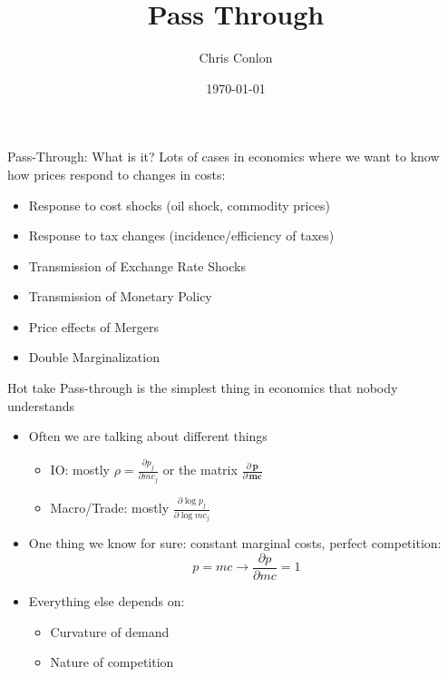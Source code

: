 \documentclass[aspectratio=169,10pt]{beamer}
\begin{document}
\title{Pass Through}
\author{Chris Conlon}
\date{\today}

\frame{\titlepage}


\begin{frame}{Pass-Through: What is it?}
Lots of cases in economics where we want to know how prices respond to changes in costs:

\begin{itemize}
    \item Response to cost shocks (oil shock, commodity prices)
    \item Response to tax changes (incidence/efficiency of taxes)
    \item Transmission of Exchange Rate Shocks
    \item Transmission of Monetary Policy
    \item Price effects of Mergers
    \item Double Marginalization
\end{itemize}
\end{frame}


\begin{frame}{Hot take}
Pass-through is the simplest thing in economics that nobody understands
\begin{itemize}
\item Often we are talking about different things
\begin{itemize}
\item IO: mostly $\rho = \frac{\partial p_j}{\partial mc_j}$ or the matrix $\frac{\partial\, \symbf{p}}{\partial\, \symbf{mc}}$
\item Macro/Trade: mostly $\frac{\partial \log p_j}{\partial \log mc_j}$
\end{itemize}
\item One thing we know for sure: constant marginal costs, perfect competition: \\
 $$p = mc \rightarrow \frac{\partial p}{\partial mc} = 1$$
 \item Everything else depends on:
\begin{itemize}
\item Curvature of demand
\item Nature of competition
\end{itemize}
\end{itemize}
\end{frame}
\end{document}
